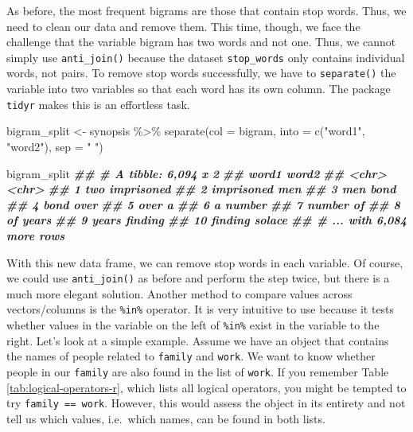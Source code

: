 \documentclass[
]{book}
\newenvironment{Shaded}{\begin{snugshade}}{\end{snugshade}}
\newcommand{\AttributeTok}[1]{\textcolor[rgb]{0.77,0.63,0.00}{#1}}
\newcommand{\DocumentationTok}[1]{\textcolor[rgb]{0.56,0.35,0.01}{\textbf{\textit{#1}}}}
\newcommand{\FunctionTok}[1]{\textcolor[rgb]{0.00,0.00,0.00}{#1}}
\newcommand{\NormalTok}[1]{#1}
\newcommand{\OtherTok}[1]{\textcolor[rgb]{0.56,0.35,0.01}{#1}}
\newcommand{\SpecialCharTok}[1]{\textcolor[rgb]{0.00,0.00,0.00}{#1}}
\newcommand{\StringTok}[1]{\textcolor[rgb]{0.31,0.60,0.02}{#1}}
\begin{document}
As before, the most frequent bigrams are those that contain stop words. Thus, we need to clean our data and remove them. This time, though, we face the challenge that the variable bigram has two words and not one. Thus, we cannot simply use \texttt{anti\_join()} because the dataset \texttt{stop\_words} only contains individual words, not pairs. To remove stop words successfully, we have to \texttt{separate()} the variable into two variables so that each word has its own column. The package \texttt{tidyr} makes this is an effortless task.

\begin{Shaded}
\begin{Highlighting}[]
\NormalTok{bigram\_split }\OtherTok{\textless{}{-}}\NormalTok{ synopsis }\SpecialCharTok{\%\textgreater{}\%}
  \FunctionTok{separate}\NormalTok{(}\AttributeTok{col =}\NormalTok{ bigram,}
           \AttributeTok{into =} \FunctionTok{c}\NormalTok{(}\StringTok{"word1"}\NormalTok{, }\StringTok{"word2"}\NormalTok{),}
           \AttributeTok{sep =} \StringTok{" "}\NormalTok{)}

\NormalTok{bigram\_split}
\DocumentationTok{\#\# \# A tibble: 6,094 x 2}
\DocumentationTok{\#\#    word1      word2     }
\DocumentationTok{\#\#    \textless{}chr\textgreater{}      \textless{}chr\textgreater{}     }
\DocumentationTok{\#\#  1 two        imprisoned}
\DocumentationTok{\#\#  2 imprisoned men       }
\DocumentationTok{\#\#  3 men        bond      }
\DocumentationTok{\#\#  4 bond       over      }
\DocumentationTok{\#\#  5 over       a         }
\DocumentationTok{\#\#  6 a          number    }
\DocumentationTok{\#\#  7 number     of        }
\DocumentationTok{\#\#  8 of         years     }
\DocumentationTok{\#\#  9 years      finding   }
\DocumentationTok{\#\# 10 finding    solace    }
\DocumentationTok{\#\# \# ... with 6,084 more rows}
\end{Highlighting}
\end{Shaded}

With this new data frame, we can remove stop words in each variable. Of course, we could use \texttt{anti\_join()} as before and perform the step twice, but there is a much more elegant solution. Another method to compare values across vectors/columns is the \texttt{\%in\%} operator. It is very intuitive to use because it tests whether values in the variable on the left of \texttt{\%in\%} exist in the variable to the right. Let's look at a simple example. Assume we have an object that contains the names of people related to \texttt{family} and \texttt{work}. We want to know whether people in our \texttt{family} are also found in the list of \texttt{work}. If you remember Table \ref{tab:logical-operators-r}, which lists all logical operators, you might be tempted to try \texttt{family\ ==\ work}. However, this would assess the object in its entirety and not tell us which values, i.e.~which names, can be found in both lists.
\end{document}
